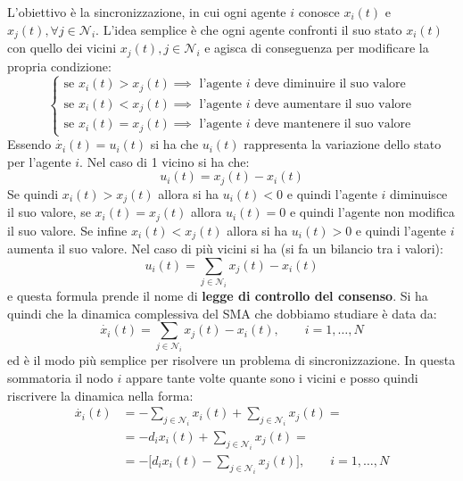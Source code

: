 L'obiettivo \`e la sincronizzazione, in cui ogni agente $i$ conosce $x_i(t)$ e $x_j(t), \forall j \in \mathcal{N}_i$. 
L'idea semplice \`e che ogni agente confronti il suo stato $x_i(t)$ con quello dei vicini $x_j(t), j \in \mathcal{N}_i$ e agisca di conseguenza per modificare la propria condizione:
\begin{equation}
\begin{cases}
\text{se } x_i(t) > x_j(t) \implies \text{ l'agente $i$ deve diminuire il suo valore} \\
\text{se } x_i(t) < x_j(t) \implies \text{ l'agente $i$ deve aumentare il suo valore} \\
\text{se } x_i(t) = x_j(t) \implies \text{ l'agente $i$ deve mantenere il suo valore} 
\end{cases}
\end{equation}
Essendo $\dot{x_i}(t) = u_i(t)$ si ha che $u_i(t)$ rappresenta la variazione dello stato per l'agente $i$. 
Nel caso di 1 vicino si ha che:
\begin{equation}
u_i(t) = x_j(t) - x_i(t)
\end{equation}
Se quindi $x_i(t) > x_j(t)$ allora si ha $u_i(t)<0$ e quindi l'agente $i$ diminuisce il suo valore, se $x_i(t)=x_j(t)$ allora $u_i(t)=0$ e quindi l'agente non modifica il suo valore. Se infine $x_i(t) < x_j(t)$ allora si ha $u_i(t)>0$ e quindi l'agente $i$ aumenta il suo valore.
Nel caso di pi\`u vicini si ha (si fa un bilancio tra i valori):
\begin{equation}
u_i(t) = \sum_{j \in \mathcal{N}_i} x_j(t) - x_i(t)
\end{equation}
e questa formula prende il nome di \textbf{legge di controllo del consenso}.
Si ha quindi che la dinamica complessiva del SMA che dobbiamo studiare \`e data da:
\begin{equation}
\dot{x_i}(t) = \sum_{j \in \mathcal{N}_i} x_j(t) - x_i(t), \qquad i=1, \dots, N
\end{equation}
ed \`e il modo pi\`u semplice per risolvere un problema di sincronizzazione.
In questa sommatoria il nodo $i$ appare tante volte quante sono i vicini e posso quindi riscrivere la dinamica nella forma:
\begin{align*}
\dot{x_i}(t) &= -\sum_{j \in \mathcal{N}_i} x_i(t) + \sum_{j \in \mathcal{N}_i} x_j(t) = \\
&= -d_i x_i(t) + \sum_{j \in \mathcal{N}_i} x_j(t) = \\
&= - \Big [ d_i x_i(t) - \sum_{j \in \mathcal{N}_i} x_j(t) \Big], \qquad i=1, \dots, N
\end{align*}

